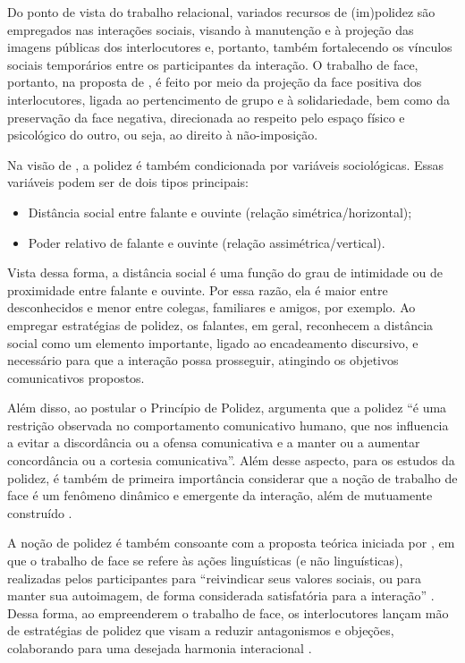 \documentclass[portuguese]{textolivre}
\begin{document}
Do ponto de vista do trabalho relacional, variados recursos de (im)polidez são empregados nas interações sociais, visando à manutenção e à projeção das imagens públicas dos interlocutores e, portanto, também fortalecendo os vínculos sociais temporários entre os participantes da interação. O trabalho de face, portanto, na proposta de \textcite{brown1987}, é feito por meio da projeção da face positiva dos interlocutores, ligada ao pertencimento de grupo e à solidariedade, bem como da preservação da face negativa, direcionada ao respeito pelo espaço físico e psicológico do outro, ou seja, ao direito à não-imposição.

Na visão de \textcite{miller2008}, a polidez é também condicionada por variáveis sociológicas.  Essas variáveis podem ser de dois tipos principais: 

\begin{itemize}
    \item Distância social entre falante e ouvinte (relação simétrica/horizontal);
    \item Poder relativo de falante e ouvinte (relação assimétrica/vertical).
\end{itemize}

Vista dessa forma, a distância social é uma função do grau de intimidade ou de proximidade entre falante e ouvinte. Por essa razão, ela é maior entre desconhecidos e menor entre colegas, familiares e amigos, por exemplo. Ao empregar estratégias de polidez, os falantes, em geral, reconhecem a distância social como um elemento importante, ligado ao encadeamento discursivo, e necessário para que a interação possa prosseguir, atingindo os objetivos comunicativos propostos.

Além disso, ao postular o Princípio de Polidez, \cite[p. 87]{leech2014} argumenta que a polidez “é uma restrição observada no comportamento comunicativo humano, que nos influencia a evitar a discordância ou a ofensa comunicativa e a manter ou a aumentar concordância ou a cortesia comunicativa”. Além desse aspecto, para os estudos da polidez, é também de primeira importância considerar que a noção de trabalho de face é um fenômeno dinâmico e emergente da interação, além de mutuamente construído \cite{culpeper2003,spencer2007,grainger2018}.

A noção de polidez é também consoante com a proposta teórica iniciada por \textcite{goffman1967}, em que o trabalho de face se refere às ações linguísticas (e não linguísticas), realizadas pelos participantes para “reivindicar seus valores sociais, ou para manter sua autoimagem, de forma considerada satisfatória para a interação” \cite[p. 65]{haugh2013}. Dessa forma, ao empreenderem o trabalho de face, os interlocutores lançam mão de estratégias de polidez que visam a reduzir antagonismos e objeções, colaborando para uma desejada harmonia interacional \cite{brown1987,kerbrat1992}.
\end{document}
